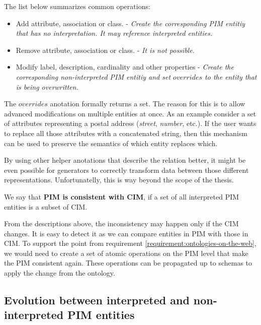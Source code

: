 The list below summarizes common operations:

\begin{itemize}
    \item Add attribute, association or class. - \textit{Create the corresponding PIM entitiy that has no interpretation. It may reference interpreted entities.}
    \item Remove attribute, association or class. - \textit{It is not possible.}
    \item Modify label, description, cardinality and other properties - \textit{Create the corresponding non-interpreted PIM entitiy and set $overrides$ to the entity that is being overwritten.}
\end{itemize}

The $overrides$ anotation formally returns a set. The reason for this is to allow advanced modifications on multiple entities at once. As an example consider a set of attributes representing a postal address (\textit{street}, \textit{number}, etc.). If the user wants to replace all those attributes with a concatenated string, then this mechanism can be used to preserve the semantics of which entity replaces which.

By using other helper anotations that describe the relation better, it might be even possible for generators to correctly transform data between those different representations. Unfortunatelly, this is way beyond the scope of the thesis.

\bigskip

\begin{definition}[consistency]
    We say that \textbf{PIM is consistent with CIM}, if a set of all interpreted PIM entities is a subset of CIM.
\end{definition}

From the descriptions above, the inconsistency may happen only if the CIM changes. It is easy to detect it as we can compare entities in PIM with those in CIM. To support the  point from requirement \ref{requirement:ontologies-on-the-web}, we would need to create a set of atomic operations on the PIM level that make the PIM consistent again. These operations can be propagated up to schemas to apply the change from the ontology.

\subsection{Evolution between interpreted and non-interpreted PIM entities}

